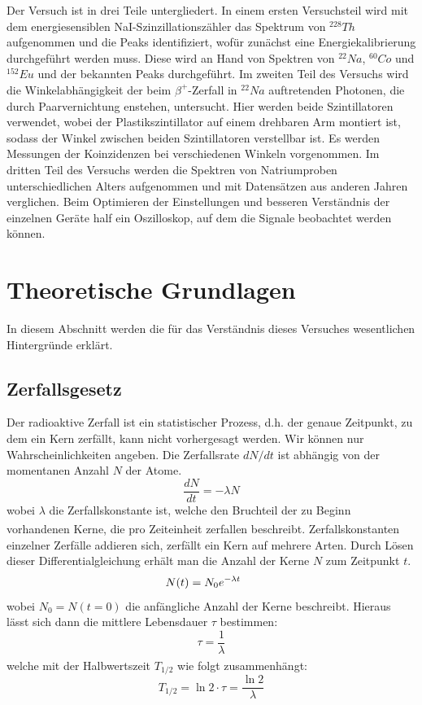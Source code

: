 \documentclass[12pt,listof=totoc]{scrartcl}
\begin{document}
Der Versuch ist in drei Teile untergliedert. 
In einem ersten Versuchsteil wird mit dem energiesensiblen NaI-Szinzillationszähler das Spektrum von  $^{228}Th$ aufgenommen und die Peaks identifiziert, wofür zunächst eine Energiekalibrierung durchgeführt werden muss. Diese wird an Hand von Spektren von  $^{22}Na$, $^{60}Co$ und $^{152}Eu$ und der bekannten Peaks durchgeführt.
Im zweiten Teil des Versuchs wird die Winkelabhängigkeit der beim $\beta^{+}$-Zerfall in $^{22}Na$ auftretenden Photonen, die durch Paarvernichtung enstehen, untersucht. Hier werden beide Szintillatoren verwendet, wobei der Plastikszintillator auf einem drehbaren Arm montiert ist, sodass der Winkel zwischen beiden Szintillatoren verstellbar ist. Es werden Messungen der Koinzidenzen bei verschiedenen Winkeln vorgenommen.
Im dritten Teil des Versuchs werden die Spektren von Natriumproben unterschiedlichen Alters aufgenommen und mit Datensätzen aus anderen Jahren verglichen.
Beim Optimieren der Einstellungen und besseren Verständnis der einzelnen Geräte half ein Oszilloskop, auf dem die Signale beobachtet werden können.



\newpage
\section{Theoretische Grundlagen}

In diesem Abschnitt werden die für das Verständnis dieses Versuches wesentlichen Hintergründe erklärt.

\subsection{Zerfallsgesetz\label{zerfallsgesetz}}
Der radioaktive Zerfall ist ein statistischer Prozess, d.h. der genaue Zeitpunkt, zu dem ein Kern zerfällt, kann nicht vorhergesagt werden. Wir können nur Wahrscheinlichkeiten angeben. Die Zerfallsrate $dN/dt$ ist abhängig von der momentanen Anzahl $N$ der Atome.
\[\frac{dN}{dt}=-\lambda N\]
wobei $\lambda$ die Zerfallskonstante ist, welche den Bruchteil der zu Beginn vorhandenen Kerne, die pro Zeiteinheit zerfallen beschreibt\textsuperscript{\cite{Demtröder}}. Zerfallskonstanten einzelner Zerfälle addieren sich, zerfällt ein Kern auf mehrere Arten. Durch Lösen dieser Differentialgleichung erhält man die Anzahl der Kerne $N$ zum Zeitpunkt $t$.
\[N(t)=N_0e^{-\lambda t}\hspace{0.5cm}\]
wobei $N_0=N(t=0)$ die anfängliche Anzahl der Kerne beschreibt. Hieraus lässt sich dann die mittlere Lebensdauer $\tau$ bestimmen:
\[\tau=\frac{1}{\lambda}\]
welche mit der Halbwertszeit $T_{1/2}$ wie folgt zusammenhängt:\textsuperscript{\cite{Demtröder}}
\[T_{1/2} = \ln2\cdot \tau = \frac{\ln2}{\lambda}\]
 
\end{document}
